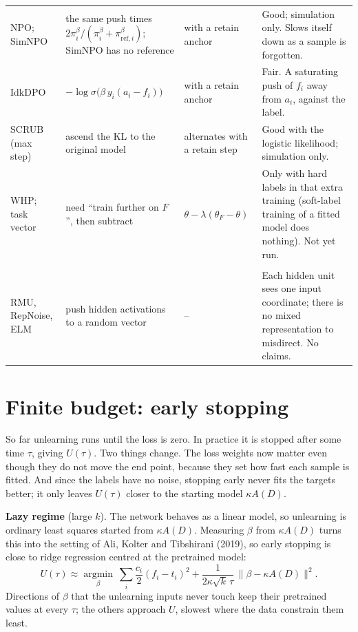 \documentclass[10pt]{article}
\begin{document}
\begin{landscape}
{\begin{longtable}{@{}>{\raggedright\arraybackslash}p{4.3cm}>{\raggedright\arraybackslash}p{7.2cm}>{\raggedright\arraybackslash}p{5.2cm}>{\raggedright\arraybackslash}p{7.6cm}@{}}
NPO; SimNPO & the same push times $2\pi_i^\beta/(\pi_i^\beta+\pi_{\mathrm{ref},i}^\beta)$; SimNPO has no reference & with a retain anchor & Good; simulation only. Slows itself down as a sample is forgotten.\\
IdkDPO & $-\log\sigma\big(\beta\,y_i(a_i-f_i)\big)$ & with a retain anchor & Fair. A saturating push of $f_i$ away from $a_i$, against the label.\\
SCRUB (max step) & ascend the KL to the original model & alternates with a retain step & Good with the logistic likelihood; simulation only.\\
WHP; task vector & need ``train further on $F$'', then subtract & $\theta-\lambda(\theta_F-\theta)$ & Only with hard labels in that extra training (soft-label training of a fitted model does nothing). Not yet run.\\
\midrule
\multicolumn{4}{@{}l}{\emph{Not representable}}\\
RMU, RepNoise, ELM & push hidden activations to a random vector & -- & Each hidden unit sees one input coordinate; there is no mixed representation to misdirect. No claims.\\
\bottomrule
\end{longtable}}
\end{landscape}\restoregeometry

\section{Finite budget: early stopping}
So far unlearning runs until the loss is zero. In practice it is stopped after some time $\tau$, giving $U(\tau)$. Two things change. The loss weights now matter even though they do not move the end point, because they set how fast each sample is fitted. And since the labels have no noise, stopping early never fits the targets better; it only leaves $U(\tau)$ closer to the starting model $\kappa A(D)$.

\textbf{Lazy regime} (large $k$). The network behaves as a linear model, so unlearning is ordinary least squares started from $\kappa A(D)$. Measuring $\beta$ from $\kappa A(D)$ turns this into the setting of Ali, Kolter and Tibshirani (2019), so early stopping is close to ridge regression centred at the pretrained model:
\[
U(\tau)\approx\operatorname*{argmin}_\beta\ \sum_i\frac{c_i}{2}(f_i-t_i)^2+\frac{1}{2\kappa\sqrt k\,\tau}\,\big\|\beta-\kappa A(D)\big\|^2 .
\]
Directions of $\beta$ that the unlearning inputs never touch keep their pretrained values at every $\tau$; the others approach $U$, slowest where the data constrain them least.
\end{document}
